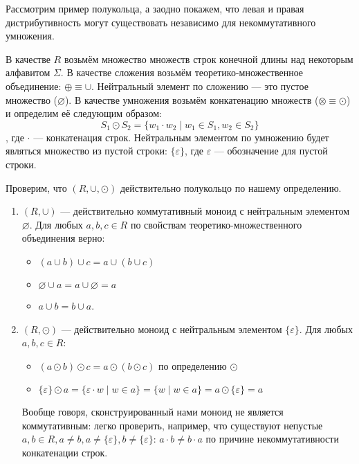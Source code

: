 \begin{example}\label{exmpl:semiring}
	Рассмотрим пример полукольца, а заодно покажем, что левая и правая дистрибутивность могут существовать независимо для некоммутативного умножения.

	В качестве $R$ возьмём множество множеств строк конечной длины над некоторым алфавитом $\Sigma$. В качестве сложения возьмём теоретико-множественное объединение: $\oplus  \equiv \cup$. Нейтральный элемент по сложению --- это пустое множество ($\varnothing$).
	В качестве умножения возьмём конкатенацию множеств ($\otimes  \equiv \odot$) и определим её следующим образом:
	$$ S_1 \odot S_2 = \{ w_1 \cdot w_2 \mid w_1 \in S_1, w_2 \in S_2\}$$, где $\cdot$ --- конкатенация строк. Нейтральным элементом по умножению будет являться множество из пустой строки: $\{\varepsilon\}$, где $\varepsilon$ --- обозначение для пустой строки.

	Проверим, что $(R, \cup, \odot)$ действительно полукольцо по нашему определению.

	\begin{enumerate}

		\item $(R, \cup)$ --- действительно коммутативный моноид с нейтральным элементом $\varnothing$. Для любых $a,b,c \in R$ по свойствам теоретико-множественного объединения верно:
		      \begin{itemize}
			      \item $(a \cup b) \cup c = a \cup (b \cup c)$
			      \item $\varnothing \cup a = a \cup \varnothing = a$
			      \item $a \cup b = b \cup a$.
		      \end{itemize}

		\item $(R, \odot)$ --- действительно моноид с нейтральным элементом $\{\varepsilon\}$. Для любых $a,b,c \in R$:
		      \begin{itemize}
			      \item $(a \odot b) \odot c = a \odot (b \odot c)$ по определению $\odot$
			      \item $\{\varepsilon\} \odot a = \{\varepsilon \cdot w \mid w \in a \} = \{w \mid w \in a \} = a \odot \{\varepsilon\} = a$
		      \end{itemize}
		      Вообще говоря, сконструированный нами моноид не является коммутативным: легко проверить, например, что существуют непустые $a,b \in R, a \neq b, a \neq \{\varepsilon\}, b \neq \{\varepsilon\}$: $a \cdot b \neq b \cdot a$ по причине некоммутативности конкатенации строк.


\end{enumerate}
\end{example}
